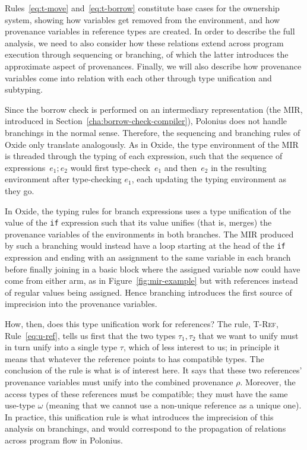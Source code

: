 \documentclass[11pt,a4paper,twoside,openany]{report}
\newcommand{\InRust}[1]{\texttt{#1}}
\newcommand{\expression}[1]{\boxed{#1}}
\renewcommand\_{\textunderscore\allowbreak}
\begin{document}
Rules~\eqref{eq:t-move} and~\eqref{eq:t-borrow} constitute base cases for the
ownership system, showing how variables get removed from the environment, and
how provenance variables in reference types are created. In order to describe
the full analysis, we need to also consider how these relations extend across
program execution through sequencing or branching, of which the latter
introduces the approximate aspect of provenances. Finally, we will also describe
how provenance variables come into relation with each other through type
unification and subtyping.

Since the borrow check is performed on an intermediary representation (the MIR,
introduced in Section~\ref{cha:borrow-check-compiler}), Polonius does not handle
branchings in the normal sense. Therefore, the sequencing and branching rules of
Oxide only translate analogously. As in Oxide, the type environment of the MIR
is threaded through the typing of each expression, such that the sequence of
expressions~$\expression{e_1; e_2}$ would first type-check~$e_1$ and then~$e_2$
in the resulting environment after type-checking $e_1$, each updating the typing
environment as they go.

In Oxide, the typing rules for branch expressions uses a type unification of the
value of the \InRust{if} expression such that its value unifies (that is,
merges) the provenance variables of the environments in both branches. The MIR
produced by such a branching would instead have a loop starting at the head of
the \InRust{if} expression and ending with an assignment to the same variable in
each branch before finally joining in a basic block where the assigned variable
now could have come from either arm, as in Figure~\ref{fig:mir-example} but with
references instead of regular values being assigned. Hence branching introduces
the first source of imprecision into the provenance variables.

How, then, does this type unification work for references? The rule,
\textsc{T-Ref}, Rule~\eqref{eq:u-ref}, tells us first that the two types
$\tau_1, \tau_2$ that we want to unify must in turn unify into a single type
$\tau$, which of less interest to us; in principle it means that whatever the
reference points to has compatible types. The conclusion of the rule is what is
of interest here. It says that these two references' provenance variables must
unify into the combined provenance $\rho$. Moreover, the access types of these
references must be compatible; they must have the same use-type $\omega$
(meaning that we cannot use a non-unique reference as a unique one). In
practice, this unification rule is what introduces the imprecision of this
analysis on branchings, and would correspond to the propagation of relations
across program flow in Polonius.
\end{document}
